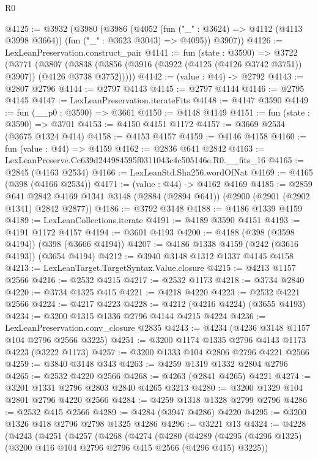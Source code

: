 \begin{lexlean}{R0}
\begin{coremodule}
@4125 := @3932
    (@3980
      (@3986
        (@4052 (fun ("_" : @3624) => @4112 (@4113 @3998 @3664)) (fun ("_" : @3623 @3043) => @4095))
        @3907))
@4126 := LexLeanPreservation.construct_pair
@4141 := fun (state : @3590) =>
  @3722
    (@3771
      (@3807 (@3838 (@3856 (@3916 (@3922 (@4125 (@4126 @3742 @3751)) @3907)) (@4126 @3738 @3752)))))
@4142 := (value : @44) -> @2792
@4143 := @2807 @2796
@4144 := @2797 @4143
@4145 := @2797 @4144
@4146 := @2795 @4145
@4147 := LexLeanPreservation.iterateFits
@4148 := @4147 @3590
@4149 := fun (__p0 : @3590) => @3661
@4150 := @4148 @4149
@4151 := fun (state : @3590) => @3701
@4153 := @4150 @4151 @1172
@4157 := @3669 @2534 (@3675 @1324 @414)
@4158 := @4153 @4157
@4159 := @4146 @4158
@4160 := fun (value : @44) => @4159
@4162 := @2836 @641 @2842
@4163 := LexLeanPreserve.Cc639d244984595f0311043c4c505146e.R0.__fits_16
@4165 := @2845 (@4163 @2534)
@4166 := LexLeanStd.Sha256.wordOfNat
@4169 := @4165 (@398 (@4166 @2534))
@4171 := (value : @44) -> @4162 @4169
@4185 := @2859
    @641
    @2842
    @4169
    @1341
    @3148
    (@2884 (@2894 @641))
    (@2900 (@2901 (@2902 @1341) @2842 @2877))
@4186 := @3792 @3148
@4188 := @4186 @1339 @4159
@4189 := LexLeanCollections.iterate
@4191 := @4189 @3590 @4151
@4193 := @4191 @1172 @4157
@4194 := @3601 @4193
@4200 := @4188 (@398 (@3598 @4194)) (@398 (@3666 @4194))
@4207 := @4186 @1338 @4159 (@242 (@3616 @4193)) (@3654 @4194)
@4212 := @3940 @3148 @1312 @1337 @4145 @4158
@4213 := LexLeanTarget.TargetSyntax.Value.closure
@4215 := @4213 @1157 @2566
@4216 := @2532 @4215
@4217 := @2532 @1173
@4218 := @3734 @2840
@4220 := @3734 @1325 @415
@4221 := @4218 @4220
@4223 := @2532 @4221 @2566
@4224 := @4217 @4223
@4228 := @4212 (@4216 @4224) (@3655 @4193)
@4234 := @3200 @1315 @1336 @2796 @4144 @4215 @4224
@4236 := LexLeanPreservation.conv_closure @2835
@4243 := @4234 (@4236 @3148 @1157 @104 @2796 @2566 @3225)
@4251 := @3200 @1174 @1335 @2796 @4143 @1173 @4223 (@3222 @1173)
@4257 := @3200 @1333 @104 @2806 @2796 @4221 @2566
@4259 := @3840 @3148 @343
@4263 := @4259 @1319 @1332 @2804 @2796
@4265 := @2532 @4220 @2566
@4268 := @4263 (@2841 @4265) @4221
@4274 := @3201 @1331 @2796 @2803 @2840 @4265 @3213
@4280 := @3200 @1329 @104 @2801 @2796 @4220 @2566
@4284 := @4259 @1318 @1328 @2799 @2796
@4286 := @2532 @415 @2566
@4289 := @4284 (@3947 @4286) @4220
@4295 := @3200 @1326 @418 @2796 @2798 @1325 @4286
@4296 := @3221 @13
@4324 := @4228
    (@4243
      (@4251
        (@4257
          (@4268
            (@4274
              (@4280
                (@4289
                  (@4295 (@4296 @1325) (@3200 @416 @104 @2796 @2796 @415 @2566 (@4296 @415) @3225))

\end{coremodule}
\end{lexlean}
